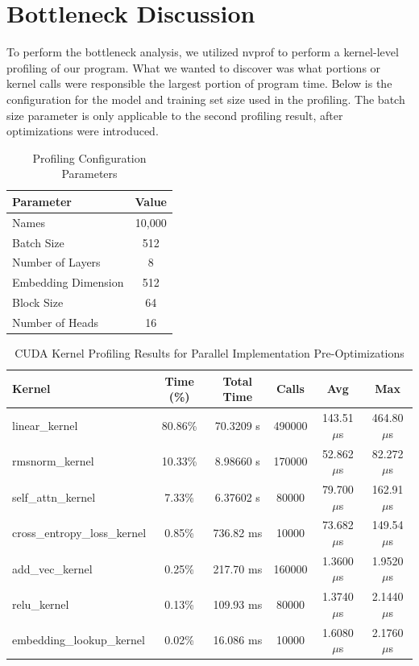 \section{Bottleneck Discussion}
\label{sec:bottleneck}

To perform the bottleneck analysis, we utilized nvprof to perform a kernel-level profiling of our program. What we wanted to discover was what portions or kernel calls 
were responsible the largest portion of program time. Below is the configuration for the model and training set size used in the profiling. The batch size
parameter is only applicable to the second profiling result, after optimizations were introduced.
\begin{table}[H]
\centering
\small
\renewcommand{\arraystretch}{1.2}
\setlength{\tabcolsep}{6pt}
\begin{tabular}{lc}
\hline
\textbf{Parameter} & \textbf{Value} \\
\hline
Names               & 10{,}000 \\
Batch Size          & 512 \\
Number of Layers    & 8 \\
Embedding Dimension & 512 \\
Block Size          & 64 \\
Number of Heads     & 16 \\
\hline
\end{tabular}
\caption{Profiling Configuration Parameters}
\end{table}

\begin{table}[H]
\centering
\small
\renewcommand{\arraystretch}{1.2}
\setlength{\tabcolsep}{6pt}
\begin{tabular}{lccccc}
\hline
\textbf{Kernel} & \textbf{Time (\%)} & \textbf{Total Time} & \textbf{Calls} & \textbf{Avg} & \textbf{Max} \\
\hline
linear\_kernel & 80.86\% & 70.3209 s & 490000 & 143.51 $\mu$s & 464.80 $\mu$s \\
rmsnorm\_kernel & 10.33\% & 8.98660 s & 170000 & 52.862 $\mu$s & 82.272 $\mu$s \\
self\_attn\_kernel & 7.33\% & 6.37602 s & 80000 & 79.700 $\mu$s & 162.91 $\mu$s \\
cross\_entropy\_loss\_kernel & 0.85\% & 736.82 ms & 10000 & 73.682 $\mu$s & 149.54 $\mu$s \\
add\_vec\_kernel & 0.25\% & 217.70 ms & 160000 & 1.3600 $\mu$s & 1.9520 $\mu$s \\
relu\_kernel & 0.13\% & 109.93 ms & 80000 & 1.3740 $\mu$s & 2.1440 $\mu$s \\
embedding\_lookup\_kernel & 0.02\% & 16.086 ms & 10000 & 1.6080 $\mu$s & 2.1760 $\mu$s \\
\hline
\end{tabular}
\caption{CUDA Kernel Profiling Results for Parallel Implementation Pre-Optimizations}
\end{table}

